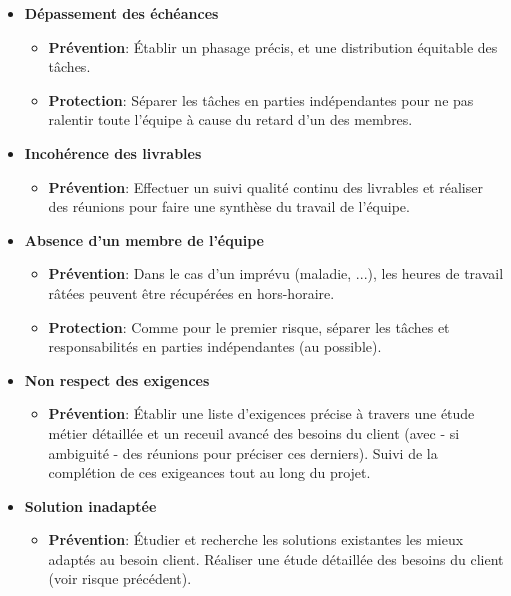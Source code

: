 \begin{itemize}

  \item \textbf{Dépassement des échéances}
        \begin{itemize}
          \item \textbf{Prévention}: Établir un phasage précis, et une distribution équitable des tâches.
          \item \textbf{Protection}: Séparer les tâches en parties indépendantes pour ne pas ralentir toute l'équipe à cause du retard d'un des membres.
        \end{itemize}

  \item \textbf{Incohérence des livrables}
        \begin{itemize}
          \item \textbf{Prévention}: Effectuer un suivi qualité continu des livrables et réaliser des réunions pour faire une synthèse du travail de l'équipe.
        \end{itemize}

  \item \textbf{Absence d'un membre de l'équipe}
        \begin{itemize}
          \item \textbf{Prévention}: Dans le cas d'un imprévu (maladie, ...), les heures de travail râtées peuvent être récupérées en hors-horaire.
          \item \textbf{Protection}: Comme pour le premier risque, séparer les tâches et responsabilités en parties indépendantes (au possible).
        \end{itemize}


  \item \textbf{Non respect des exigences}
        \begin{itemize}
          \item \textbf{Prévention}: Établir une liste d'exigences précise à travers une étude métier détaillée et un receuil avancé des besoins du client (avec - si ambiguité - des réunions pour préciser ces derniers). Suivi de la complétion de ces exigeances tout au long du projet.
        \end{itemize}


  \item \textbf{Solution inadaptée}
        \begin{itemize}
          \item \textbf{Prévention}: Étudier et recherche les solutions existantes les mieux adaptés au besoin client. Réaliser une étude détaillée des besoins du client (voir risque précédent).
        \end{itemize}



\end{itemize}
